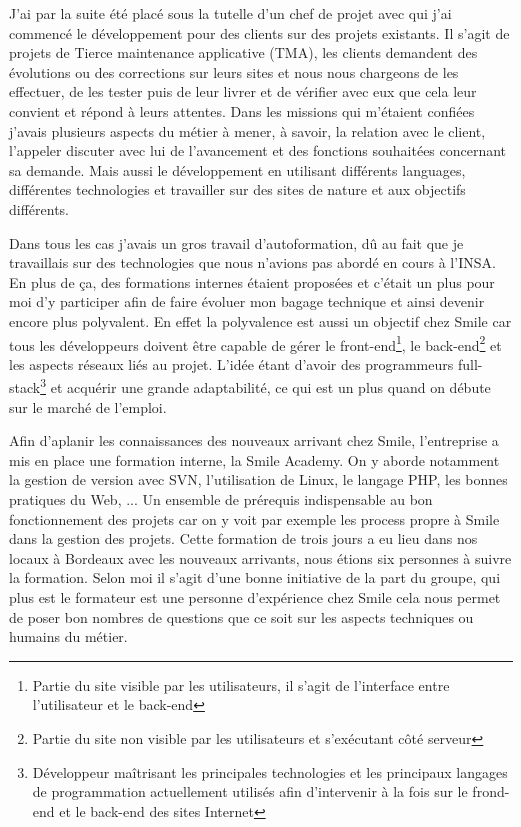 \documentclass[a4paper,11pt,twoside]{report}
\begin{document}
  J'ai par la suite été placé sous la tutelle d'un chef de projet avec qui j'ai commencé le développement pour des clients sur des projets existants. Il s'agit de projets de Tierce maintenance applicative (TMA), les clients demandent des évolutions ou des corrections sur leurs sites et nous nous chargeons de les effectuer, de les tester puis de leur livrer et de vérifier avec eux que cela leur convient et répond à leurs attentes. Dans les missions qui m'étaient confiées j'avais plusieurs aspects du métier à mener, à savoir, la relation avec le client, l'appeler discuter avec lui de l'avancement et des fonctions souhaitées concernant sa demande. Mais aussi le développement en utilisant différents languages, différentes technologies et travailler sur des sites de nature et aux objectifs différents.\newline 
  
  Dans tous les cas j'avais un gros travail d'autoformation, dû au fait que je travaillais sur des technologies que nous n'avions pas abordé en cours à l'INSA. En plus de ça, des formations internes étaient proposées et c'était un plus pour moi d'y participer afin de faire évoluer mon bagage technique et ainsi devenir encore plus polyvalent. En effet la polyvalence est aussi un objectif chez Smile car tous les développeurs doivent être capable de gérer le front-end\footnote{Partie du site visible par les utilisateurs, il s'agit de l'interface entre l'utilisateur et le back-end}, le back-end\footnote{Partie du site non visible par les utilisateurs et s'exécutant côté serveur} et les aspects réseaux liés au projet. L'idée étant d'avoir des programmeurs full-stack\footnote{Développeur maîtrisant les principales technologies et les principaux langages de programmation actuellement utilisés afin d'intervenir à la fois sur le frond-end et le back-end des sites Internet} et acquérir une grande adaptabilité, ce qui est un plus quand on débute sur le marché de l'emploi.\newline
  
  Afin d'aplanir les connaissances des nouveaux arrivant chez Smile, l'entreprise a mis en place une formation interne, la Smile Academy. On y aborde notamment la gestion de version avec SVN, l'utilisation de Linux, le langage PHP, les bonnes pratiques du Web, ... Un ensemble de prérequis indispensable au bon fonctionnement des projets car on y voit par exemple les process propre à Smile dans la gestion des projets. Cette formation de trois jours a eu lieu dans nos locaux à Bordeaux avec les nouveaux arrivants, nous étions six personnes à suivre la formation. Selon moi il s'agit d'une bonne initiative de la part du groupe, qui plus est le formateur est une personne d'expérience chez Smile cela nous permet de poser bon nombres de questions que ce soit sur les aspects techniques ou humains du métier.\newline
  
\end{document}
